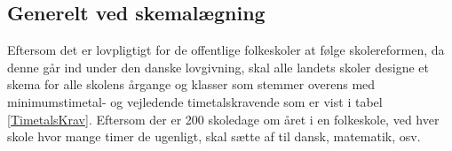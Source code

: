 \subsection{Generelt ved skemalægning}
Eftersom det er lovpligtigt for de offentlige folkeskoler at følge skolereformen, da denne går ind under den danske lovgivning, skal alle landets skoler designe et skema for alle skolens årgange og klasser som stemmer overens med minimumstimetal- og vejledende timetalskravende som er vist i tabel \ref{TimetalsKrav}. Eftersom der er 200 skoledage om året i en folkeskole\cite{elevers_timetal}, ved hver skole hvor mange timer de ugenligt, skal sætte af til dansk, matematik, osv. 




